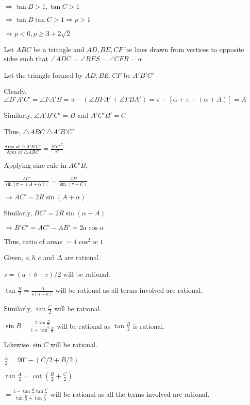   $\Rightarrow \tan B>1, \tan C> 1$

  $\Rightarrow \tan B\tan C > 1 \Rightarrow p > 1$

  $\Rightarrow p < 0, p\geq 3 + 2\sqrt{2}$

\item Let $ABC$ be a triangle and $AD, BE, CF$ be lines drawn from vertices to opposite sides such that $\angle
  ADC = \angle BES = \angle CFB = \alpha$

  Let the triangle formed by $AD, BE, CF$ be $A'B'C'$

  Clearly, $\angle B'A'C' = \angle FA'B = \pi - (\angle BFA' + \angle FBA') = \pi - [\alpha + \pi - (\alpha + A)] = A$

  Similarly, $\angle A'B'C'= B$ and $A'C'B' = C$

  Thus, $\triangle ABC ~ \triangle A'B'C'$

  $\frac{\text{Area of }\triangle A'B'C'}{\text{Area of }\triangle ABC} = \frac{B'C'^2}{a^2}$

  Applying sine rule in $AC'B,$

  $\frac{AC'}{\sin[\pi - (A + \alpha)]} = \frac{AB}{\sin(\pi - C)}$

  $\Rightarrow AC' = 2R\sin(A + \alpha)$

  Similarly, $BC' = 2R\sin(\alpha - A)$

  $\Rightarrow B'C' = AC' - AB' = 2a\cos\alpha$

  Thus, ratio of areas $= 4\cos^2\alpha:1$

\item Given, $a,b,c$ and $\Delta$ are rational.

  $s = (a + b + c)/2$ will be rational.

  $\tan\frac{B}{2} = \frac{\Delta}{s(s - a)}$ will be rational as all terms involved are rational.

  Similarly, $\tan\frac{C}{2}$ will be rational.

  $\sin B = \frac{2\tan\frac{B}{2}}{1 + \tan^2\frac{B}{2}}$ will be rational as $\tan\frac{B}{2}$ is rational.

  Likewise $\sin C$ will be rational.

  $\frac{A}{2} = 90^\circ - (C/2 + B/2)$

  $\tan\frac{A}{2} = \cot\left(\frac{B}{2} + \frac{C}{2}\right)$

  $= \frac{1 - \tan\frac{B}{2}\tan\frac{C}{2}}{\tan\frac{B}{2} + \tan\frac{C}{2}}$ will be rational as all the terms
  involved are rational.

